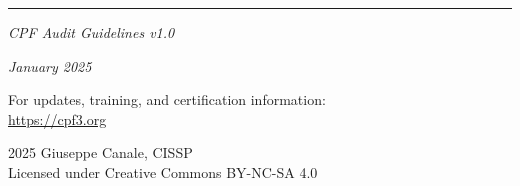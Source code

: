 \documentclass[11pt,a4paper]{article}
\begin{document}
\vspace{2em}

\begin{center}
\rule{0.8\textwidth}{0.4pt}

\vspace{1em}

\textit{CPF Audit Guidelines v1.0}

\textit{January 2025}

\vspace{0.5em}

For updates, training, and certification information:\\
\url{https://cpf3.org}

\vspace{0.5em}

\textcopyright{} 2025 Giuseppe Canale, CISSP\\
Licensed under Creative Commons BY-NC-SA 4.0

\end{center}
\end{document}
